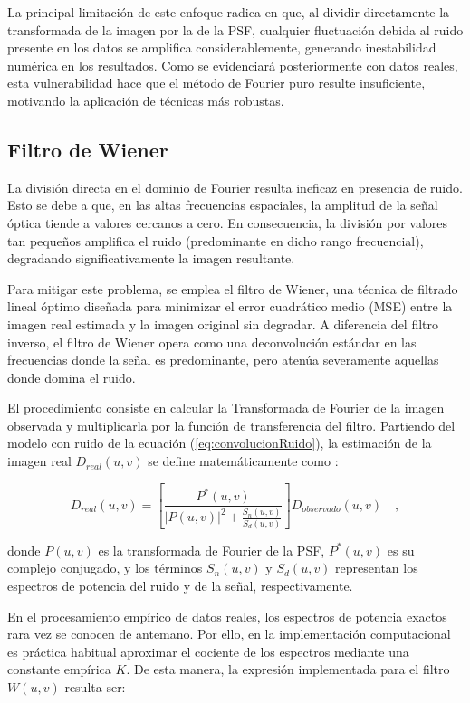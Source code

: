La principal limitación de este enfoque radica en que, al dividir directamente la transformada de la imagen por la de la PSF, cualquier fluctuación debida al ruido presente en los datos se amplifica considerablemente, generando inestabilidad numérica en los resultados. Como se evidenciará posteriormente con datos reales, esta vulnerabilidad hace que el método de Fourier puro resulte insuficiente, motivando la aplicación de técnicas más robustas.

\subsection{Filtro de Wiener}

La división directa en el dominio de Fourier resulta ineficaz en presencia de ruido. Esto se debe a que, en las altas frecuencias espaciales, la amplitud de la señal óptica tiende a valores cercanos a cero. En consecuencia, la división por valores tan pequeños amplifica el ruido (predominante en dicho rango frecuencial), degradando significativamente la imagen resultante.

Para mitigar este problema, se emplea el filtro de Wiener, una técnica de filtrado lineal óptimo diseñada para minimizar el error cuadrático medio (MSE) entre la imagen real estimada y la imagen original sin degradar. A diferencia del filtro inverso, el filtro de Wiener opera como una deconvolución estándar en las frecuencias donde la señal es predominante, pero atenúa severamente aquellas donde domina el ruido.

El procedimiento consiste en calcular la Transformada de Fourier de la imagen observada y multiplicarla por la función de transferencia del filtro. Partiendo del modelo con ruido de la ecuación (\ref{eq:convolucionRuido}), la estimación de la imagen real $D_{real}(u,v)$ se define matemáticamente como \cite[cap. 5]{gonzalezDigitalImageProcessing2018}:

\begin{equation}
    D_{real}(u,v) = \left[ \frac{P^*(u,v)}{|P(u,v)|^2 + \frac{S_n(u,v)}{S_d(u,v)}} \right] D_{observado}(u,v) \quad,
\end{equation}

donde $P(u,v)$ es la transformada de Fourier de la PSF, $P^*(u,v)$ es su complejo conjugado, y los términos $S_n(u,v)$ y $S_d(u,v)$ representan los espectros de potencia del ruido y de la señal, respectivamente. 

En el procesamiento empírico de datos reales, los espectros de potencia exactos rara vez se conocen de antemano. Por ello, en la implementación computacional es práctica habitual aproximar el cociente de los espectros mediante una constante empírica $K$. De esta manera, la expresión implementada para el filtro $W(u,v)$ resulta ser:

